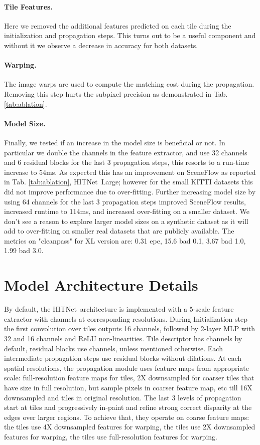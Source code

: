 \documentclass[final]{cvpr}
\newcommand{\algoname}{HITNet}
\begin{document}
\paragraph{Tile Features.} Here we removed the additional features predicted on each tile during the initialization and propagation steps. This turns out to be a useful component and without it we observe a decrease in accuracy for both datasets.
\paragraph{Warping.} The image warps are used to compute the matching cost during the propagation. Removing this step hurts the subpixel precision as demonstrated in  Tab. \ref{tab:ablation}.
\paragraph{Model Size.} Finally, we tested if an increase in the model size is beneficial or not. In particular we double the channels in the feature extractor, and use 32 channels and 6 residual blocks for the last 3 propagation steps, this resorts to a run-time increase to 54ms. As expected this has an improvement on SceneFlow as reported in Tab. \ref{tab:ablation}, \algoname \ Large; however for the small KITTI datasets this did not improve performance due to over-fitting. Further increasing model size by using 64 channels for the last 3 propagation steps improved SceneFlow results, increased runtime to 114ms, and increased over-fitting on a smaller dataset. We don't see a reason to explore larger model sizes on a synthetic dataset as it will add to over-fitting on smaller real datasets that are publicly available. The metrics on "cleanpass" for XL version are: 0.31 epe, 15.6 bad 0.1, 3.67 bad 1.0, 1.99 bad 3.0.


\section{Model Architecture Details}
\label{sec:arch_details}
By default, the \algoname \ architecture is implemented with a 5-scale feature extractor with  channels at corresponding resolutions. During Initialization step the first convolution over  tiles outputs 16 channels, followed by 2-layer MLP with 32 and 16 channels and ReLU non-linearities. Tile descriptor has  channels by default, residual blocks use  channels, unless mentioned otherwise. Each intermediate propagation steps use  residual blocks without dilations. At each spatial resolutions, the propagation module uses feature maps from appropriate scale: full-resolution feature maps for  tiles, 2X downsampled for coarser tiles that have size  in full resolution, but sample  pixels in coarser feature map, etc till 16X downsampled and  tiles in original resolution. The last 3 levels of propagation start at  tiles and progressively in-paint and refine strong correct disparity at the edges over larger regions. To achieve that, they operate on coarse feature maps: the  tiles use 4X downsampled features for warping, the  tiles use 2X downsampled features for warping, the  tiles use full-resolution features for warping. 
\end{document}
